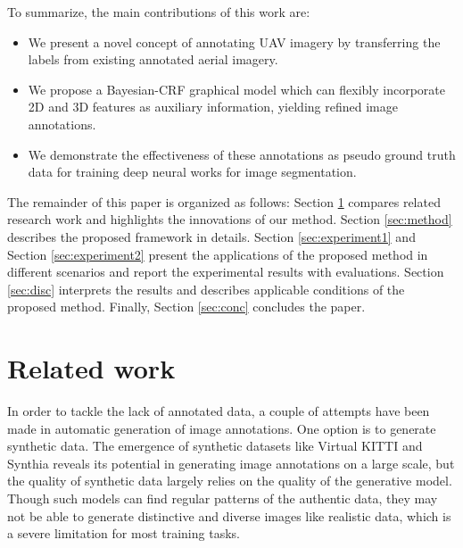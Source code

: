 To summarize, the main contributions of this work are:
\begin{itemize}
\item We present a novel concept of annotating UAV imagery by transferring the labels from existing annotated aerial imagery.
\item We propose a Bayesian-CRF graphical model which can flexibly incorporate 2D and 3D features as auxiliary information, yielding refined image annotations. 
\item We demonstrate the effectiveness of these annotations as pseudo ground truth data for training deep neural works for image segmentation.
\end{itemize}

The remainder of this paper is organized as follows: Section \ref{sec:related} compares related research work and highlights the innovations of our method. Section \ref{sec:method} describes the proposed framework in details. Section \ref{sec:experiment1} and Section \ref{sec:experiment2} present the applications of the proposed method in different scenarios and report the experimental results with evaluations. Section \ref{sec:disc} interprets the results and describes applicable conditions of the proposed method. Finally, Section \ref{sec:conc} concludes the paper.
\section{Related work}
\label{sec:related}

In order to tackle the lack of annotated data, a couple of attempts have been made in automatic generation of image annotations. One option is to generate synthetic data. The emergence of synthetic datasets like Virtual KITTI \cite{gaidon2016virtual} and Synthia \cite{Ros2016synthetic} reveals its potential in generating image annotations on a large scale, but the quality of synthetic data largely relies on the quality of the generative model. Though such models can find regular patterns of the authentic data, they may not be able to generate distinctive and diverse images like realistic data, which is a severe limitation for most training tasks.


